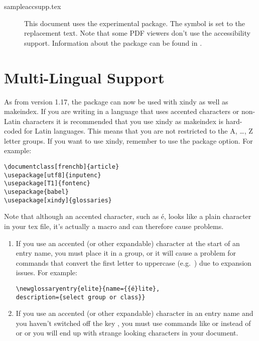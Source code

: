 \documentclass[report]{nlctdoc}
\let\glsation\glsuserii
\newcommand*{\gloskey}[2][newglossaryentry]{\csopt{#1}{#2}}
\begin{document}
\begin{description}
\item[sampleaccsupp.tex]\label{ex:sampleaccsupp} This document
uses the experimental  package. The
symbol is set to the replacement text. Note that some PDF
viewers don't use the accessibility support. Information 
about the  package can be found in
.

\end{description}


\section{Multi-Lingual Support}
\label{sec:languages}

As from version 1.17, the  package can now be
used with \gls{xindy} as well as \gls{makeindex}. If you
are writing in a language that uses accented characters or
non-Latin characters it is recommended that you use \gls*{xindy}
as \gls*{makeindex} is hard-coded for Latin languages. This
means that you are not restricted to the A, \ldots, Z letter groups.
If you want to use \gls*{xindy}, remember to use the
 package option. For example:
\begin{verbatim}
\documentclass[frenchb]{article}
\usepackage[utf8]{inputenc}
\usepackage[T1]{fontenc}
\usepackage{babel}
\usepackage[xindy]{glossaries}
\end{verbatim}

\begin{important}
Note that although an accented character, such as é, looks like a plain
character in your tex file, it's actually a macro and can therefore
cause problems.

\begin{enumerate}
\item
If you use an accented (or other expandable) character at the start of
an entry name, you must place it in a group, or it will cause
a problem for commands that convert the first letter to uppercase
(e.g.\ ) due to expansion issues. For example:
\begin{verbatim}
\newglossaryentry{elite}{name={{é}lite},
description={select group or class}}
\end{verbatim}

\item If you use an accented (or other expandable) character in an
entry name and you haven't switched off the \gloskey{name} key
\glsation{sanitize}, you must use commands like
 or  instead of  or
 or you will end up with strange looking characters in
your document.

\end{enumerate}
\end{important}
\end{document}
